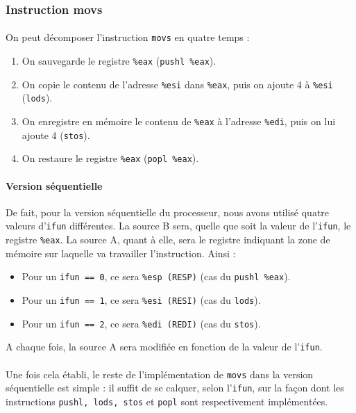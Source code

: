 \documentclass[12pt]{article}
\begin{document}
\subsubsection{Instruction movs}
\paragraph{}On peut décomposer l'instruction \verb+movs+ en quatre temps :
\begin{enumerate}
\item On sauvegarde le registre \verb+%eax+ (\verb+pushl %eax+).
\item On copie le contenu de l'adresse \verb+%esi+ dans \verb+%eax+, puis on ajoute 4 à \verb+%esi+ (\verb+lods+).
\item On enregistre en mémoire le contenu de \verb+%eax+ à l'adresse \verb+%edi+, puis on lui ajoute 4 (\verb+stos+).
\item On restaure le registre \verb+%eax+ (\verb+popl %eax+).
\end{enumerate}

\paragraph{Version séquentielle}De fait, pour la version séquentielle du processeur, nous avons utilisé quatre valeurs d'\verb+ifun+ différentes. La source B sera, quelle que soit la valeur de l'\verb+ifun+, le registre \verb+%eax+. La source A, quant à elle, sera le registre indiquant la zone de mémoire sur laquelle va travailler l'instruction. Ainsi :
\begin{itemize}
\item Pour un \verb+ifun == 0+, ce sera \verb+%esp (RESP)+ (cas du \verb+pushl %eax+).
\item Pour un \verb+ifun == 1+, ce sera \verb+%esi (RESI)+ (cas du \verb+lods+).
\item Pour un \verb+ifun == 2+, ce sera \verb+%edi (REDI)+ (cas du \verb+stos+).
\end{itemize}
A chaque fois, la source A sera modifiée en fonction de la valeur de l'\verb+ifun+.

\paragraph{}Une fois cela établi, le reste de l'implémentation de \verb+movs+ dans la version séquentielle est simple : il suffit de se calquer, selon l'\verb+ifun+, sur la façon dont les instructions \verb+pushl, lods, stos+ et \verb+popl+ sont respectivement implémentées.
\end{document}
